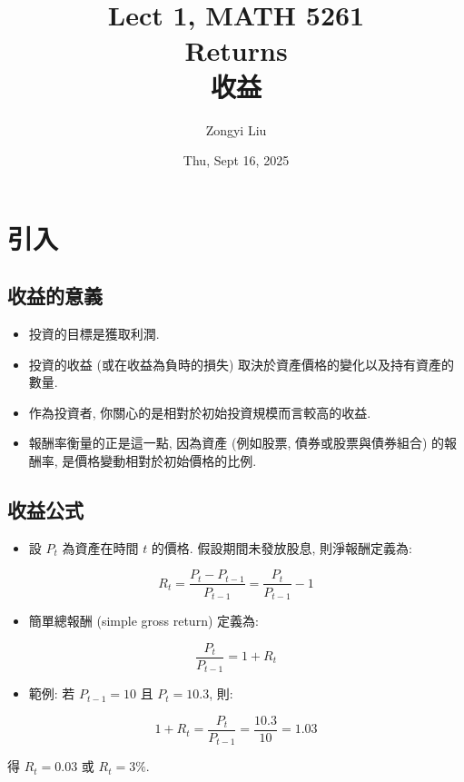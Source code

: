 \documentclass[letterpaper]{article}
\title{Lect 1, MATH 5261 \\
		\small{Returns\\
			收益
		}
	}
\author{Zongyi Liu}
\date{Thu, Sept 16, 2025}
\begin{document}
		\maketitle
		
		\tableofcontents
		
		\section{引入}
		\subsection{收益的意義}
		\begin{itemize}
			\item 投資的目標是獲取利潤. 
			\item 投資的收益 (或在收益為負時的損失) 取決於資產價格的變化以及持有資產的數量. 
			\item 作為投資者, 你關心的是相對於初始投資規模而言較高的收益. 
			\item 報酬率衡量的正是這一點, 因為資產 (例如股票, 債券或股票與債券組合) 的報酬率, 是價格變動相對於初始價格的比例. 
		\end{itemize}
		
		
		\subsection{收益公式}
		\begin{itemize}
			\item 設 $P_{t}$ 為資產在時間 $t$ 的價格. 假設期間未發放股息, 則淨報酬定義為: 
		\end{itemize}
		
		$$
		R_{t}=\frac{P_{t}-P_{t-1}}{P_{t-1}}=\frac{P_{t}}{P_{t-1}}-1
		$$
		
		\begin{itemize}
			\item 簡單總報酬 (simple gross return) 定義為: 
		\end{itemize}
		
		$$
		\frac{P_{t}}{P_{t-1}}=1+R_{t}
		$$
		
		\begin{itemize}
			\item 範例: 若 $P_{t-1}=10$ 且 $P_{t}=10.3$, 則: 
		\end{itemize}
		
		$$
		1+R_{t}=\frac{P_{t}}{P_{t-1}}=\frac{10.3}{10}=1.03
		$$
		
		得 $R_{t}=0.03$ 或 $R_{t}=3 \%$.
		
\end{document}
